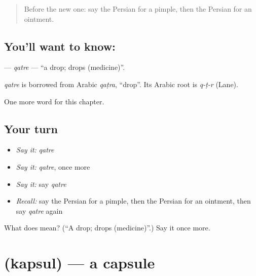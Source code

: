 \label{lesson:FA-C151-qatre}



\begin{quote}
Before the new one: say the Persian for a pimple, then the Persian for an ointment.
\end{quote}

\subsection*{You'll want to know: }
\textbf{} — \emph{qatre} — \textquotedblleft{}a drop; drops (medicine)\textquotedblright{}.

\begin{cousinweb}
\emph{qatre} is borrowed from Arabic \emph{qaṭra}, \textquotedblleft{}drop\textquotedblright{}. Its Arabic root is \emph{q-ṭ-r} (Lane).
\end{cousinweb}

\begin{grammarlens}[title={What you've built}]
One more word for this chapter.
\end{grammarlens}

\subsection*{Your turn}
\begin{itemize}
\raggedright
  \item \emph{Say it:} \emph{qatre}
  \item \emph{Say it:} \emph{qatre}, once more
  \item \emph{Say it:} say \emph{qatre}
  \item \emph{Recall:} say the Persian for a pimple, then the Persian for an ointment, then say \emph{qatre} again
\end{itemize}

\begin{tcolorbox}[breakable,colback=teal!4,colframe=teal!35!black,title={Before you move on}]
What does  mean? (\textquotedblleft{}A drop; drops (medicine)\textquotedblright{}.) Say it once more.
\end{tcolorbox}
\section[\texorpdfstring{\fa{کپسول} (kapsul)}{کپسول (kapsul)}]{ (kapsul) — a capsule}

\label{lesson:FA-C151-kapsul}



